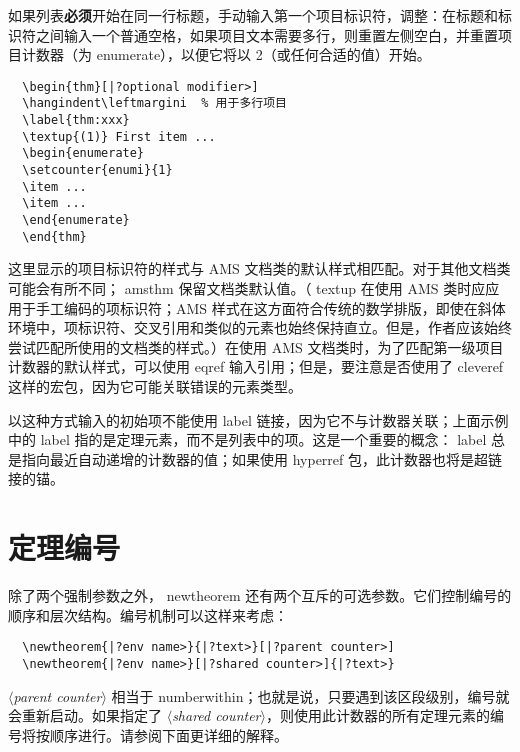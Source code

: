 \documentclass[11pt,twoside,fontset=sikou,punct=kaiming]{ctexart}
\renewcommand{\emph}[1]{\textbf{#1}}
\newcommand{\ntt}{%
  \ttfamily\mdseries\upshape%
}
\DeclareRobustCommand{\cn}[1]{{\ntt\bslchar#1}}
\DeclareRobustCommand{\pkg}[1]{{\ntt#1}}
\DeclareRobustCommand{\env}[1]{{\ntt#1}}
\def\<#1>{{\normalfont$\langle$\textit{#1}$\rangle$}}
\begin{document}
如果列表\emph{必须}开始在同一行标题，手动输入第一个项目标识符，调整：在标题和标识符之间输入一个普通空格，如果项目文本需要多行，则重置左侧空白，并重置项目计数器（为 \env{enumerate}），以便它将以 2（或任何合适的值）开始。
\begin{verbatim}
  \begin{thm}[|?optional modifier>]
  \hangindent\leftmargini  % 用于多行项目
  \label{thm:xxx}
  \textup{(1)} First item ...
  \begin{enumerate}
  \setcounter{enumi}{1}
  \item ...
  \item ...
  \end{enumerate}
  \end{thm}
\end{verbatim}
这里显示的项目标识符的样式与 AMS 文档类的默认样式相匹配。对于其他文档类可能会有所不同；\pkg{amsthm} 保留文档类默认值。（\cn{textup} 在使用 AMS 类时应应用于手工编码的项标识符；AMS 样式在这方面符合传统的数学排版，即使在斜体环境中，项标识符、交叉引用和类似的元素也始终保持直立。但是，作者应该始终尝试匹配所使用的文档类的样式。）在使用 AMS 文档类时，为了匹配第一级项目计数器的默认样式，可以使用 \cn{eqref} 输入引用；但是，要注意是否使用了 \pkg{cleveref} 这样的宏包，因为它可能关联错误的元素类型。

以这种方式输入的初始项不能使用 \cn{label} 链接，因为它不与计数器关联；上面示例中的 \cn{label} 指的是定理元素，而不是列表中的项。这是一个重要的概念：\cn{label} 总是指向最近自动递增的计数器的值；如果使用 \pkg{hyperref} 包，此计数器也将是超链接的锚。




\enlargethispage{1\baselineskip} %

\section{定理编号}

除了两个强制参数之外，\cn{newtheorem} 还有两个互斥的可选参数。它们控制编号的顺序和层次结构。编号机制可以这样来考虑：
\begin{verbatim}
  \newtheorem{|?env name>}{|?text>}[|?parent counter>]
  \newtheorem{|?env name>}[|?shared counter>]{|?text>}
\end{verbatim}
\<parent counter> 相当于 \cn{numberwithin}；也就是说，只要遇到该区段级别，编号就会重新启动。如果指定了 \<shared counter>，则使用此计数器的所有定理元素的编号将按顺序进行。请参阅下面更详细的解释。
\end{document}
